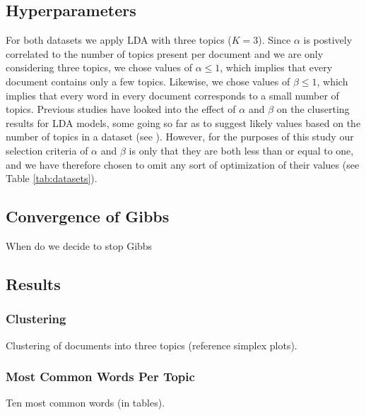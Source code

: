 \documentclass[10pt]{article}
\begin{document}
%
%
\subsection{Hyperparameters}
For both datasets we apply LDA with three topics ($K = 3$). Since $\alpha$ is postively correlated to the number of topics present per document and we are only considering three topics, we chose values of $\alpha \leq 1$, which implies that every document contains only a few topics. Likewise, we chose values of $\beta \leq 1$, which implies that every word in every document corresponds to a small number of topics. Previous studies have looked into the effect of $\alpha$ and $\beta$ on the cluserting results for LDA models, some going so far as to suggest likely values based on the number of topics in a dataset (see \cite{Griffiths2004}). However, for the purposes of this study our selection criteria of $\alpha$ and $\beta$ is only that they are both less than or equal to one, and we have therefore chosen to omit any sort of optimization of their values (see Table \ref{tab:datasets}).


%
%
\subsection{Convergence of Gibbs}
When do we decide to stop Gibbs


%
%
\subsection{Results}

\subsubsection{Clustering}
Clustering of documents into three topics (reference simplex plots).

\subsubsection{Most Common Words Per Topic}
Ten most common words (in tables).
\end{document}
